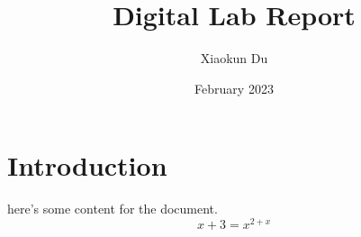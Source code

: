\documentclass{article}
\title{Digital Lab Report}
\author{Xiaokun Du}
\date{February 2023}
\begin{document}
\maketitle


\section{Introduction}

here's some content for the document.
\[x + 3 = x ^ {2+x}\]
\end{document}
